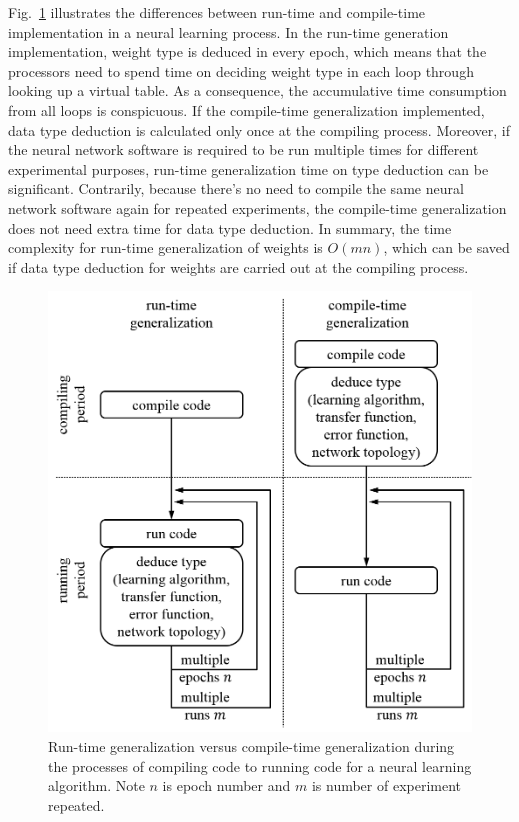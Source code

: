 \documentclass[procedia]{easychair}
\begin{document}
Fig.~\ref{fig:run_vs_compile} illustrates the differences between run-time and compile-time implementation in a neural learning process.  In the run-time generation implementation, weight type is deduced in every epoch, which means that the processors need to spend time on deciding weight type in each loop through looking up a virtual table.  As a consequence, the accumulative time consumption from all loops is conspicuous.  If the compile-time generalization implemented, data type deduction is calculated only once at the compiling process.  Moreover, if the neural network software is required to be run multiple times for different experimental purposes, run-time generalization time on type deduction can be significant.  Contrarily, because there’s no need to compile the same neural network software again for repeated experiments, the compile-time generalization does not need extra time for data type deduction.  In summary, the time complexity for run-time generalization of weights is $O(mn)$, which can be saved if data type deduction for weights are carried out at the compiling process.

\begin{figure}[tb]
    \begin{centering}
        \includegraphics[scale=0.5]{../../pic/run_vs_compile.png}
        \caption{Run-time generalization versus compile-time generalization during the processes of compiling code to running code for a neural learning algorithm.  Note $n$ is epoch number and $m$ is number of experiment repeated.}
        \label{fig:run_vs_compile}
	\end{centering}
\end{figure}
\end{document}
